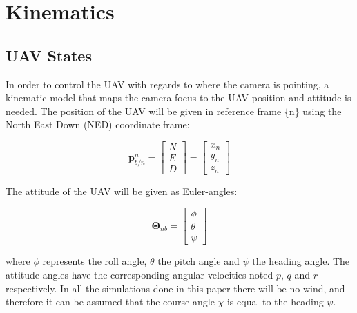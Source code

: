 \section{Kinematics}
\label{ch:kinematics}

\subsection{UAV States}
In order to control the UAV with regards to where the camera is pointing, a kinematic model that maps the camera focus to the UAV position and attitude is needed. The position of the UAV will be given in reference frame \{n\} using the North East Down (NED) coordinate frame:

\begin{equation}
	\bm{p}_{b/n}^n =
	\begin{bmatrix}
		N \\ E \\ D
	\end{bmatrix}
	=
	\begin{bmatrix}
		x_n \\ y_n \\ z_n
	\end{bmatrix}
\end{equation}

The attitude of the UAV will be given as Euler-angles:

\begin{equation}
	\bm{\Theta}_{nb} = 
	\begin{bmatrix}
		\phi \\ \theta \\ \psi
	\end{bmatrix}
\end{equation}
	
where $\phi$ represents the roll angle, $\theta$ the pitch angle and $\psi$ the heading angle. The attitude angles have the corresponding angular velocities noted $p$, $q$ and $r$ respectively. In all the simulations done in this paper there will be no wind, and therefore it can be assumed that the course angle $\chi$ is equal to the heading $\psi$.
	
%
	
